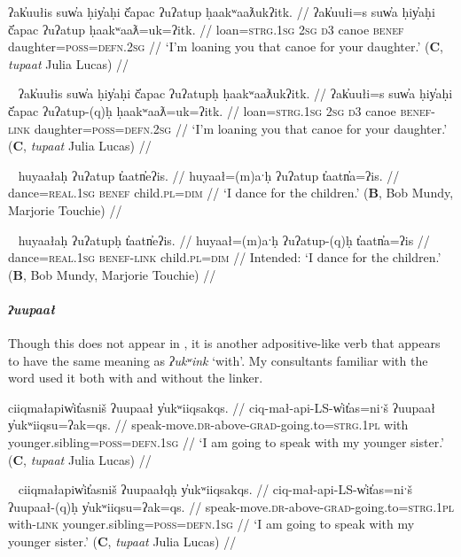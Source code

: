 \ex \label{ex:uatup}
\begingl
\glpreamble ʔak̓uułis suw̓a ḥiy̓aḥi č̓apac ʔuʔatup ḥaakʷaaƛukʔitk. //
\gla ʔak̓uułi=s suw̓a ḥiy̓aḥi č̓apac ʔuʔatup ḥaakʷaaƛ=uk=ʔitk. //
\glb loan=\textsc{strg.1sg} \textsc{2sg} \textsc{d3} canoe \textsc{benef} daughter=\textsc{poss}=\textsc{defn.2sg} //
\glft `I’m loaning you that canoe for your daughter.' (\textbf{C}, \textit{tupaat} Julia Lucas) //
\endgl
\xe

\ex~ \label{ex:uatuph}
\begingl
\glpreamble ʔak̓uułis suw̓a ḥiy̓aḥi č̓apac ʔuʔatupḥ ḥaakʷaaƛukʔitk. //
\gla ʔak̓uułi=s suw̓a ḥiy̓aḥi č̓apac ʔuʔatup-(q)ḥ ḥaakʷaaƛ=uk=ʔitk. //
\glb loan=\textsc{strg.1sg} \textsc{2sg} \textsc{d3} canoe \textsc{benef}-\textsc{link} daughter=\textsc{poss}=\textsc{defn.2sg} //
\glft `I’m loaning you that canoe for your daughter.' (\textbf{C}, \textit{tupaat} Julia Lucas) //
\endgl
\xe

\ex~ \label{ex:uatup2}
\begingl
\glpreamble huyaałaḥ ʔuʔatup t̓aatn̓eʔis. //
\gla huyaał=(m)aˑḥ ʔuʔatup t̓aatn̓a=ʔis. //
\glb dance=\textsc{real.1sg} \textsc{benef} child.\textsc{pl}=\textsc{dim} //
\glft `I dance for the children.' (\textbf{B}, Bob Mundy, Marjorie Touchie) //
\endgl
\xe

\ex~ \label{ex:uatuph2}
\begingl
\glpreamble *huyaałaḥ ʔuʔatupḥ t̓aatn̓eʔis. //
\gla huyaał=(m)aˑḥ ʔuʔatup-(q)ḥ t̓aatn̓a=ʔis //
\glb dance=\textsc{real.1sg} \textsc{benef}-\textsc{link} child.\textsc{pl}=\textsc{dim} //
\glft Intended: `I dance for the children.' (\textbf{B}, Bob Mundy, Marjorie Touchie) //
\endgl
\xe

\paragraph{\textit{ʔuupaał}} Though this does not appear in \cite{woo2007b}, it is another adpositive-like verb that appears to have the same meaning as \textit{ʔukʷink} `with'. My consultants familiar with the word used it both with and without the linker.

\ex \label{ex:uupaal1}
\begingl
\glpreamble ciiqmałapiw̓it̓asniš ʔuupaał y̓ukʷiiqsakqs. //
\gla ciq-mał-api-LS-w̓it̓as=niˑš ʔuupaał y̓ukʷiiqsu=ʔak=qs. //
\glb speak-move.\textsc{dr}-above-\textsc{grad}-going.to=\textsc{strg.1pl} with younger.sibling=\textsc{poss}=\textsc{defn.1sg} //
\glft `I am going to speak with my younger sister.' (\textbf{C}, \textit{tupaat} Julia Lucas) //
\endgl
\xe

\ex~ \label{ex:uupaalqh1}
\begingl
\glpreamble ciiqmałapiw̓it̓asniš ʔuupaałqḥ y̓ukʷiiqsakqs. //
\gla ciq-mał-api-LS-w̓it̓as=niˑš ʔuupaał-(q)ḥ y̓ukʷiiqsu=ʔak=qs. //
\glb speak-move.\textsc{dr}-above-\textsc{grad}-going.to=\textsc{strg.1pl} with-\textsc{link} younger.sibling=\textsc{poss}=\textsc{defn.1sg} //
\glft `I am going to speak with my younger sister.' (\textbf{C}, \textit{tupaat} Julia Lucas) //
\endgl
\xe

